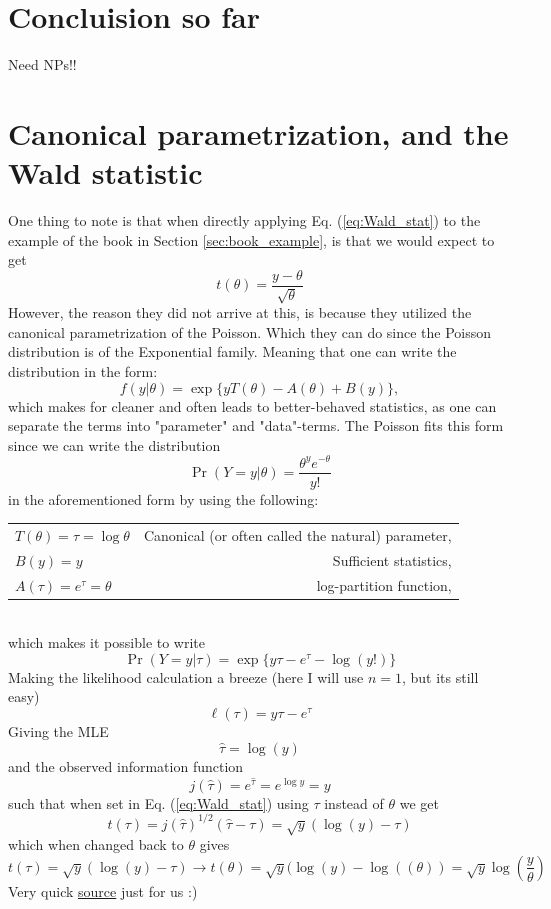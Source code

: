 \documentclass[14pt, a4paper]{article}  %
\begin{document}
\section{Concluision so far}
Need NPs!!

\clearpage
\appendix
\section{Canonical parametrization, and the Wald statistic}\label{apndx:canon}
One thing to note is that when directly applying Eq. (\ref{eq:Wald_stat}) to the example of the book in Section \ref{sec:book_example}, is that we would expect to get
$$
t(\theta) = \frac{y-\theta}{\sqrt{\theta}}
$$
However, the reason they did not arrive at this, is because they utilized the canonical parametrization of the Poisson. Which they can do since the Poisson distribution is of the Exponential family. Meaning that one can write the distribution in the form:
$$
f(y|\theta)=\exp\{yT(\theta)-A(\theta)+B(y)\},
$$
which makes for cleaner and often leads to better-behaved statistics, as one can separate the terms into "parameter" and "data"-terms. The Poisson fits this form since we can write the distribution
$$
\Pr(Y=y|\theta) = \frac{\theta^y e^{-\theta}}{y!}
$$
in the aforementioned form by using the following: \begin{table}[!ht]
    \centering
    \begin{tabular}{l r}
         $T(\theta) = \tau=\log\theta$ & Canonical (or often called the natural) parameter, \\
         $B(y)=y$ & Sufficient statistics, \\
         $A(\tau)=e^\tau=\theta$ & log-partition function,
    \end{tabular}
\end{table}
\\which makes it possible to write 
$$
\Pr(Y=y|\tau)=\exp\{y\tau-e^\tau-\log(y!)\}
$$
Making the likelihood calculation a breeze (here I will use $n=1$, but its still easy)
$$
\ell(\tau)=y\tau - e^\tau 
$$
Giving the MLE
$$
\hat\tau=\log(y)
$$
and the observed information function
$$
j(\hat\tau)=e^{\hat\tau} = e^{\log y} = y
$$
such that when set in Eq. (\ref{eq:Wald_stat}) using $\tau$ instead of $\theta$ we get
$$
t(\tau)=j(\hat\tau)^{1/2}(\hat\tau - \tau) = \sqrt{y}(\log(y) - \tau)
$$
which when changed back to $\theta$ gives
$$
t(\tau)= \sqrt{y}(\log(y) - \tau) \rightarrow t(\theta) = \sqrt{y}(\log(y) - \log((\theta)) =\sqrt{y}\log\left(\frac{y}{\theta}\right)
$$
Very quick \href{https://en.wikipedia.org/wiki/Exponential_family#Interpretation}{source} just for us :) 
\newpage
\printbibliography
\end{document}
